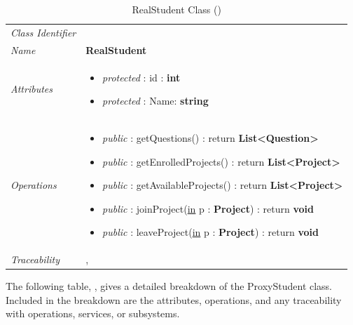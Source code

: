 \documentclass[12pt,letterpaper]{article}
\begin{document}
\begin{table}[H]
    \caption{RealStudent Class ()} 
	\begin{tabu} to 
		\toprule
		Class Identifier &  \\
		Name & {\bf RealStudent} \\
		Attributes & 
		\begin{minipage}[t]{\linewidth}
		    \begin{itemize}
		        \item \textit{protected} : id : {\bf int}
		        \item \textit{protected} : Name: {\bf string}
			\end{itemize}
	    \end{minipage} \\

		Operations &
		\begin{minipage}[t]{\linewidth}
			\begin{itemize}
			    \item {\it public} : getQuestions() : return {\bf List<Question>}
			    \item {\it public} : getEnrolledProjects() : return {\bf List<Project>}
			    \item {\it public} : getAvailableProjects() : return {\bf List<Project>}
			    \item {\it public} : joinProject(\underline{in} p : {\bf Project}) : return {\bf void}
			    \item {\it public} : leaveProject(\underline{in} p : {\bf Project}) : return {\bf void}
	        \end{itemize}
	    \end{minipage} \\
	    	Traceability & , \\
		\toprule
	\end{tabu}
\end{table}

\newpage{}
The following table, , gives a detailed breakdown of the ProxyStudent class. Included in the breakdown are the attributes, operations, and any traceability with operations, services, or subsystems.
\end{document}
